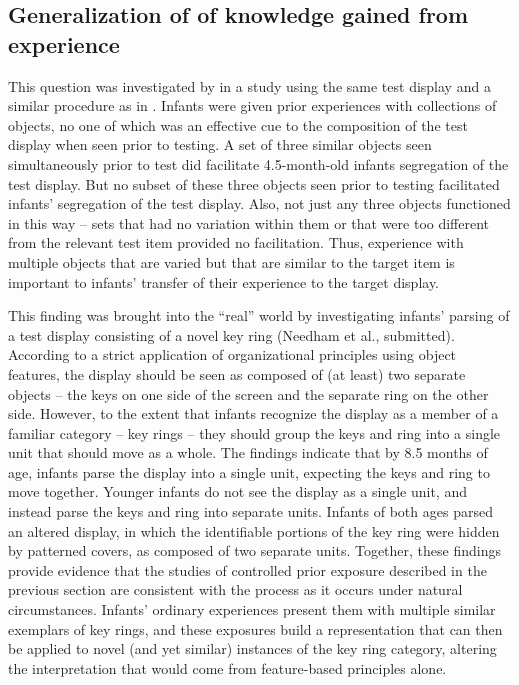 %


\subsection{Generalization of of knowledge gained from experience}

This question was investigated by 
in a study using the same test display and a similar procedure as in
.  Infants were given prior experiences with collections
of objects, no one of which was an effective cue to the composition of
the test display when seen prior to testing.  A set of three similar
objects seen simultaneously prior to test did facilitate 4.5-month-old
infants segregation of the test display.  But no subset of these three
objects seen prior to testing facilitated infants' segregation of the
test display.  Also, not just any three objects functioned in this way
-- sets that had no variation within them or that were too different
from the relevant test item provided no facilitation.  Thus,
experience with multiple objects that are varied but that are similar
to the target item is important to infants' transfer of their
experience to the target display.


This finding was brought into the ``real'' world by investigating
infants' parsing of a test display consisting of a novel key
ring (Needham et al., submitted).  According to a strict
application of organizational principles using object features, the
display should be seen as composed of (at least) two separate
objects -- the keys on one side of the screen and the separate
ring on the other side.  However, to the extent that infants recognize
the display as a member of a familiar category -- key
rings -- they should group the keys and ring into a single unit
that should move as a whole.  The findings indicate that by 8.5 months
of age, infants parse the display into a single unit, expecting the
keys and ring to move together.  Younger infants do not see the
display as a single unit, and instead parse the keys and ring into
separate units.  Infants of both ages parsed an altered display, in
which the identifiable portions of the key ring were hidden by
patterned covers, as composed of two separate units.  Together, these
findings provide evidence that the studies of controlled prior
exposure described in the previous section are consistent with the
process as it occurs under natural circumstances.  Infants'
ordinary experiences present them with multiple similar exemplars of
key rings, and these exposures build a representation that can then be
applied to novel (and yet similar) instances of the key ring category,
altering the interpretation that would come from feature-based
principles alone.


